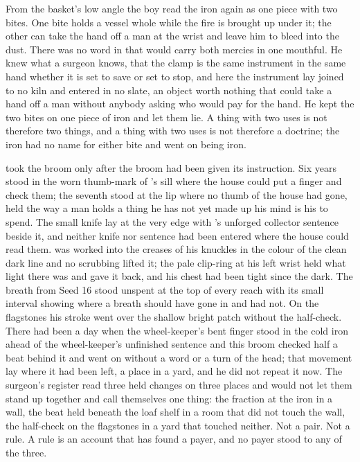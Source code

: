 From the basket's low angle the boy read the iron again as one piece with two bites. One bite holds a vessel whole while the fire is brought up under it; the other can take the hand off a man at the wrist and leave him to bleed into the dust. There was no word in  that would carry both mercies in one mouthful. He knew what a surgeon knows, that the clamp is the same instrument in the same hand whether it is set to save or set to stop, and here the instrument lay joined to no kiln and entered in no slate, an object worth nothing that could take a hand off a man without anybody asking who would pay for the hand. He kept the two bites on one piece of iron and let them lie. A thing with two uses is not therefore two things, and a thing with two uses is not therefore a doctrine; the iron had no name for either bite and went on being iron.

 took the broom only after the broom had been given its instruction. Six years stood in the worn thumb-mark of 's sill where the house could put a finger and check them; the seventh stood at the lip where no thumb of the house had gone, held the way a man holds a thing he has not yet made up his mind is his to spend. The small knife lay at the very edge with 's unforged collector sentence beside it, and neither knife nor sentence had been entered where the house could read them.  was worked into the creases of his knuckles in the colour of the clean dark line and no scrubbing lifted it; the pale clip-ring at his left wrist held what light there was and gave it back, and his chest had been tight since the dark. The breath from Seed 16 stood unspent at the top of every reach with its small interval showing where a breath should have gone in and had not. On the flagstones his stroke went over the shallow bright patch without the half-check. There had been a day when the wheel-keeper's bent finger stood in the cold iron ahead of the wheel-keeper's unfinished sentence and this broom checked half a beat behind it and went on without a word or a turn of the head; that movement lay where it had been left, a place in a yard, and he did not repeat it now. The surgeon's register read three held changes on three places and would not let them stand up together and call themselves one thing: the fraction at the iron in a wall, the beat held beneath the loaf shelf in a room that did not touch the wall, the half-check on the flagstones in a yard that touched neither. Not a pair. Not a rule. A rule is an account that has found a payer, and no payer stood to any of the three.

